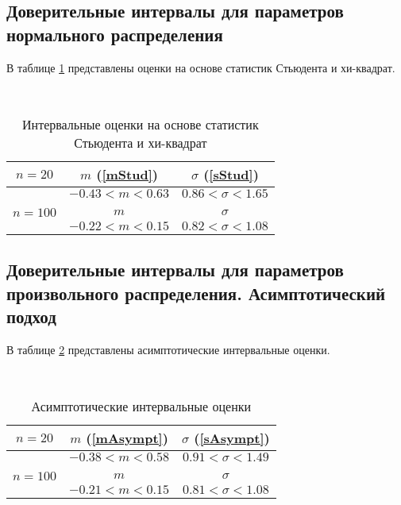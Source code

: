 \documentclass[12pt]{article}
\begin{document}
\subsection{Доверительные интервалы для параметров нормального распределения}
В таблице \ref{tabStud} представлены оценки на основе статистик Стьюдента и хи-квадрат.\\
\newpage
\begin{table}[h!]
    \begin{center}
        \caption{Интервальные оценки на основе статистик Стьюдента и хи-квадрат}
        \phantom{0}\\
        \begin{tabular}{|c|c|c|}\hline
            $n = 20$ & $m$ (\ref{mStud}) & $\sigma$ (\ref{sStud})\\
            \hline
            & $-0.43 < m < 0.63$ & $0.86 < \sigma < 1.65$\\
            \hline
            &&\\
            \hline
            $n=100$ & $m$ & $\sigma$\\
            \hline
            & $-0.22 < m < 0.15$ & $0.82 < \sigma < 1.08$\\
            \hline
        \end{tabular}
    \label{tabStud}
    \end{center}
\end{table}
\subsection{Доверительные интервалы для параметров произвольного распределения. Асимптотический подход}
В таблице \ref{tabAsympt} представлены асимптотические интервальные оценки.\\
\begin{table}[h!]
    \begin{center}
        \caption{Асимптотические интервальные оценки}
        \phantom{0}\\
        \begin{tabular}{|c|c|c|}\hline
            $n = 20$ & $m$ (\ref{mAsympt}) & $\sigma$ (\ref{sAsympt})\\
            \hline
            & $-0.38 < m < 0.58$ & $0.91 < \sigma < 1.49$\\
            \hline
            &&\\
            \hline
            $n=100$ & $m$ & $\sigma$\\
            \hline
            & $-0.21 < m < 0.15$ & $0.81 < \sigma < 1.08$\\
            \hline
        \end{tabular}
    \label{tabAsympt}
    \end{center}
\end{table}
\newpage
\end{document}
